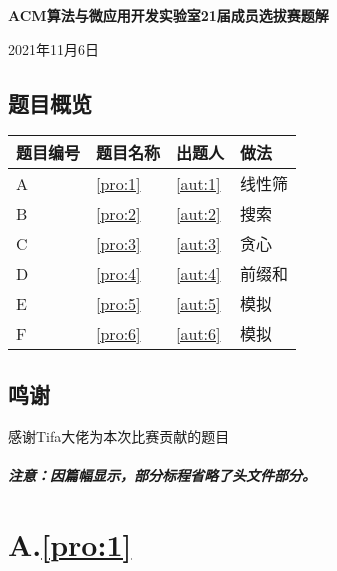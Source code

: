 \documentclass[
	lang=cn,
	color=blue
]{elegantbook}
\begin{document}
\begin{titlepage}
    \begin{center}
        \LARGE
        \textbf{ACM算法与微应用开发实验室21届成员选拔赛题解} \par
        \normalsize
        \vspace{0.5cm}
        2021年11月6日
    \end{center}

    \section*{题目概览}
    \begin{center}
        \begin{tabularx}{\textwidth}{M|M|M|M}
            \toprule
            \textbf{题目编号} & \textbf{题目名称} & \textbf{出题人} & \textbf{做法} \\
            \midrule
            A                 & \ref*{pro:1}      & \ref*{aut:1}    & 线性筛        \\
            B                 & \ref*{pro:2}      & \ref*{aut:2}    & 搜索          \\
            C                 & \ref*{pro:3}      & \ref*{aut:3}    & 贪心          \\
            D                 & \ref*{pro:4}      & \ref*{aut:4}    & 前缀和        \\
            E                 & \ref*{pro:5}      & \ref*{aut:5}    & 模拟          \\
            F                 & \ref*{pro:6}      & \ref*{aut:6}    & 模拟          \\
            \bottomrule
        \end{tabularx}
    \end{center}

    \section*{鸣谢}
    感谢Tifa大佬为本次比赛贡献的题目

    \paragraph*{注意：因篇幅显示，部分标程省略了头文件部分。}

\end{titlepage}

\chapter*{A.\quad \ref*{pro:1}}
\end{document}
